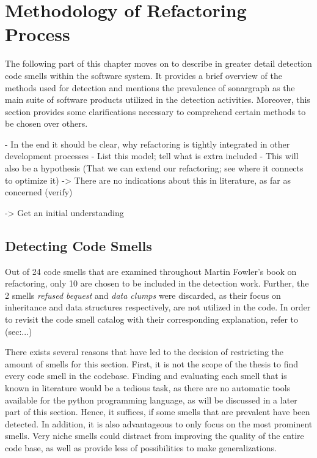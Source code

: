 \chapter{Methodology of Refactoring Process}

The following part of this chapter moves on to describe in greater detail detection code smells within the software system. It provides a brief overview of the methods used for detection and mentions the prevalence of sonargraph as the main suite of software products utilized in the detection activities. Moreover, this section provides some clarifications necessary to comprehend certain methods to be chosen over others.

- In the end it should be clear, why refactoring is tightly integrated in other development processes
- List this model; tell what is extra included
- This will also be a hypothesis (That we can extend our refactoring; see where it connects to optimize it) -> There are no indications about this in literature, as far as concerned (verify)

-> Get an initial understanding


\section{Detecting Code Smells}


Out of 24 code smells that are examined throughout Martin Fowler's book on refactoring, only 10 are chosen to be included in the detection work. Further, the 2 smells \emph{refused bequest} and \emph{data clumps} were discarded, as their focus on inheritance and data structures respectively, are not utilized in the code. In order to revisit the code smell catalog with their corresponding explanation, refer to (sec:...)
 

There exists several reasons that have led to the decision of restricting the amount of smells for this section. First, it is not the scope of the thesis to find every code smell in the codebase. Finding and evaluating each smell that is known in literature would be a tedious task, as there are no automatic tools available for the python programming language, as will be discussed in a later part of this section. Hence, it suffices, if some smells that are prevalent have been detected. In addition, it is also advantageous to only focus on the most prominent smells. Very niche smells could distract from improving the quality of the entire code base, as well as provide less of possibilities to make generalizations.

